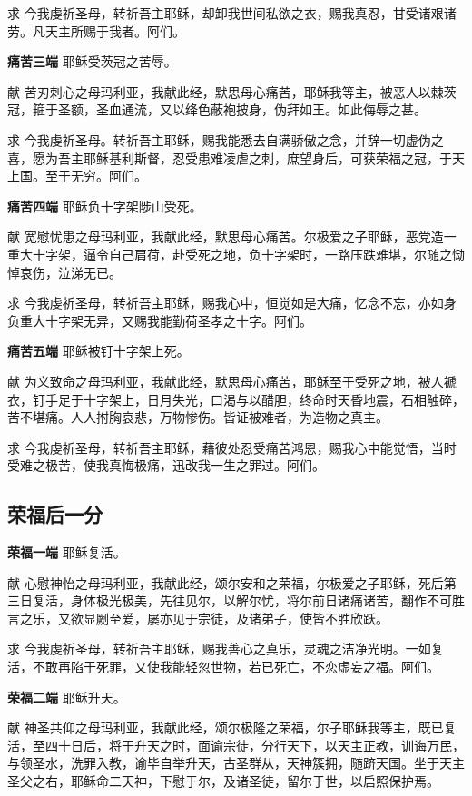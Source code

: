 \documentclass[UTF8,17pt]{ctexart}
\begin{document}
求 \quad 今我虔祈圣母，转祈吾主耶稣，却卸我世间私欲之衣，赐我真忍，甘受诸艰诸劳。凡天主所赐于我者。阿们。

\textbf{痛苦三端} \quad 耶稣受茨冠之苦辱。

献 \quad 苦刃刺心之母玛利亚，我献此经，默思母心痛苦，耶稣我等主，被恶人以棘茨冠，箍于圣额，圣血通流，又以绛色蔽袍披身，伪拜如王。如此侮辱之甚。

求 \quad 今我虔祈圣母。转祈吾主耶稣，赐我能悉去自满骄傲之念，并辞一切虚伪之喜，愿为吾主耶稣基利斯督，忍受患难凌虐之刺，庶望身后，可获荣福之冠，于天上国。至于无穷。阿们。

\textbf{痛苦四端} \quad 耶稣负十字架陟山受死。

献 \quad 宽慰忧患之母玛利亚，我献此经，默思母心痛苦。尔极爱之子耶稣，恶党造一重大十字架，逼令自己肩荷，赴受死之地，负十字架时，一路压跌难堪，尔随之恸悼哀伤，泣涕无已。

求 \quad 今我虔祈圣母，转祈吾主耶稣，赐我心中，恒觉如是大痛，忆念不忘，亦如身负重大十字架无异，又赐我能勤荷圣孝之十字。阿们。

\textbf{痛苦五端} \quad 耶稣被钉十字架上死。

献 \quad 为义致命之母玛利亚，我献此经，默思母心痛苦，耶稣至于受死之地，被人褫衣，钉手足于十字架上，日月失光，口渴与以醋胆，终命时天昏地震，石相触碎，苦不堪痛。人人拊胸哀悲，万物惨伤。皆证被难者，为造物之真主。

求 \quad 今我虔祈圣母，转祈吾主耶稣，藉彼处忍受痛苦鸿恩，赐我心中能觉悟，当时受难之极苦，使我真悔极痛，迅改我一生之罪过。阿们。

\subsection{荣福后⼀分}

\textbf{荣福⼀端} \quad 耶稣复活。

献 \quad 心慰神怡之母玛利亚，我献此经，颂尔安和之荣福，尔极爱之子耶稣，死后第三日复活，身体极光极美，先往见尔，以解尔忧，将尔前日诸痛诸苦，翻作不可胜言之乐，又欲显劂至爱，屡亦见于宗徒，及诸弟子，使皆不胜欣跃。

求 \quad 今我虔祈圣母，转祈吾主耶稣，赐我善心之真乐，灵魂之洁净光明。一如复活，不敢再陷于死罪，又使我能轻忽世物，若已死亡，不恋虚妄之福。阿们。

\textbf{荣福二端} \quad 耶稣升天。

献 \quad 神圣共仰之母玛利亚，我献此经，颂尔极隆之荣福，尔子耶稣我等主，既已复活，至四十日后，将于升天之时，面谕宗徒，分行天下，以天主正教，训诲万民，与领圣水，洗罪入教，谕毕自举升天，古圣群从，天神簇拥，随跻天国。坐于天主圣父之右，耶稣命二天神，下慰于尔，及诸圣徒，留尔于世，以启照保护焉。
\end{document}
